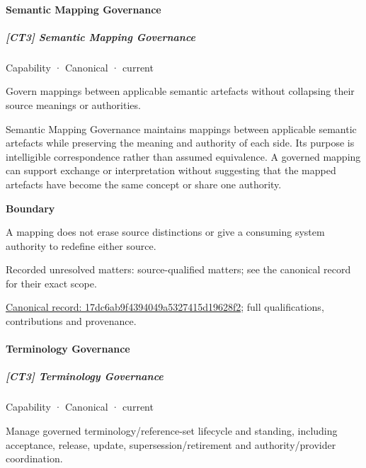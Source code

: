 \paragraph{Semantic Mapping Governance}

\subparagraph{[CT3] Semantic Mapping Governance}

\label{element:17dc6ab9f4394049a5327415d19628f2}
{\small Capability · Canonical · current}\par

Govern mappings between applicable semantic artefacts without collapsing their source meanings or authorities.



Semantic Mapping Governance maintains mappings between applicable semantic artefacts while preserving the meaning and authority of each side. Its purpose is intelligible correspondence rather than assumed equivalence. A governed mapping can support exchange or interpretation without suggesting that the mapped artefacts have become the same concept or share one authority.



\textbf{Boundary}



A mapping does not erase source distinctions or give a consuming system authority to redefine either source.


{\small Recorded unresolved matters: source-qualified matters; see the canonical record for their exact scope.}\par
{\footnotesize \href{../../../../continuum/strategy/capability/17dc6ab9f4394049a5327415d19628f2.md}{Canonical record: 17dc6ab9f4394049a5327415d19628f2}; full qualifications, contributions and provenance.}\par
\paragraph{Terminology Governance}

\subparagraph{[CT3] Terminology Governance}

\label{element:e926a47881fa482088859f59fa6fe7e4}
{\small Capability · Canonical · current}\par

Manage governed terminology/reference-set lifecycle and standing, including acceptance, release, update, supersession/retirement and authority/provider coordination.



